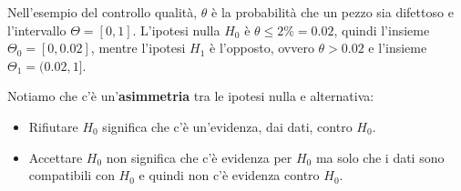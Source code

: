 Nell'esempio del controllo qualità, $\theta$ è la probabilità che un pezzo sia difettoso e
l'intervallo $\Theta = [0,1]$. L'ipotesi nulla $H_0$ è $\theta \leq 2\% = 0.02$, quindi l'insieme
$\Theta_0 = [0, 0.02]$, mentre l'ipotesi $H_1$ è l'opposto, ovvero $\theta > 0.02$ e l'insieme
$\Theta_1 = (0.02, 1]$.

Notiamo che c'è un'\textbf{asimmetria} tra le ipotesi nulla e alternativa:
\begin{itemize}
	\item Rifiutare $H_0$ significa che c'è un'evidenza, dai dati, contro $H_0$.
	\item Accettare $H_0$ non significa che c'è evidenza per $H_0$ ma solo che i dati sono
	      compatibili con $H_0$ e quindi non c'è evidenza contro $H_0$.
\end{itemize}